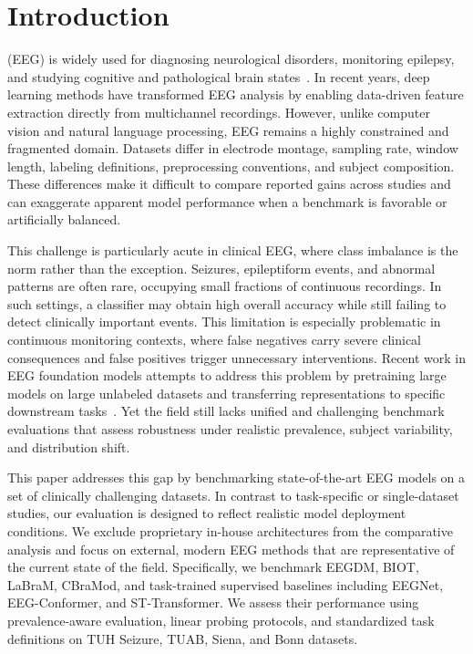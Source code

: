 \documentclass[journal]{IEEEtran}
\begin{document}
\section{Introduction}
 (EEG) is widely used for diagnosing neurological disorders, monitoring epilepsy, and studying cognitive and pathological brain states~\cite{obeid2016tuh}. In recent years, deep learning methods have transformed EEG analysis by enabling data-driven feature extraction directly from multichannel recordings. However, unlike computer vision and natural language processing, EEG remains a highly constrained and fragmented domain. Datasets differ in electrode montage, sampling rate, window length, labeling definitions, preprocessing conventions, and subject composition. These differences make it difficult to compare reported gains across studies and can exaggerate apparent model performance when a benchmark is favorable or artificially balanced.

This challenge is particularly acute in clinical EEG, where class imbalance is the norm rather than the exception. Seizures, epileptiform events, and abnormal patterns are often rare, occupying small fractions of continuous recordings. In such settings, a classifier may obtain high overall accuracy while still failing to detect clinically important events. This limitation is especially problematic in continuous monitoring contexts, where false negatives carry severe clinical consequences and false positives trigger unnecessary interventions. Recent work in EEG foundation models attempts to address this problem by pretraining large models on large unlabeled datasets and transferring representations to specific downstream tasks~\cite{yang2024biot,jiang2024labram,wang2024cbramod}. Yet the field still lacks unified and challenging benchmark evaluations that assess robustness under realistic prevalence, subject variability, and distribution shift.

This paper addresses this gap by benchmarking state-of-the-art EEG models on a set of clinically challenging datasets. In contrast to task-specific or single-dataset studies, our evaluation is designed to reflect realistic model deployment conditions. We exclude proprietary in-house architectures from the comparative analysis and focus on external, modern EEG methods that are representative of the current state of the field. Specifically, we benchmark EEGDM, BIOT, LaBraM, CBraMod, and task-trained supervised baselines including EEGNet, EEG-Conformer, and ST-Transformer. We assess their performance using prevalence-aware evaluation, linear probing protocols, and standardized task definitions on TUH Seizure, TUAB, Siena, and Bonn datasets.
\end{document}
